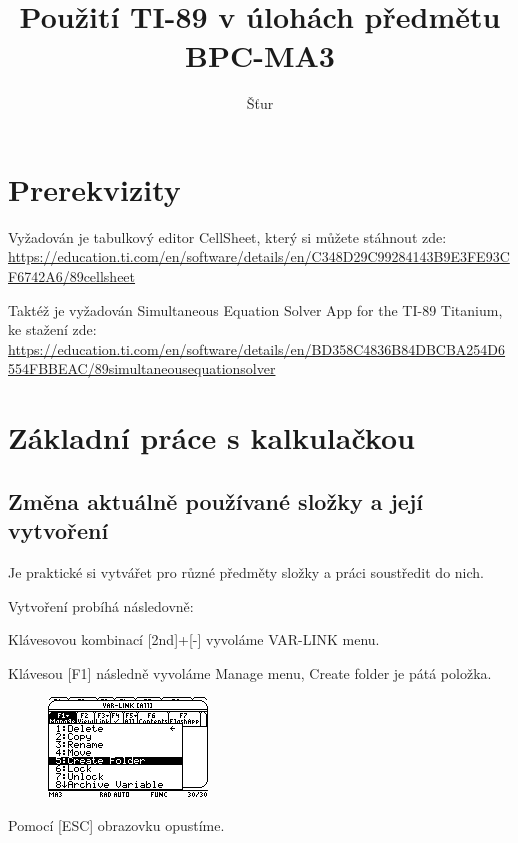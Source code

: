 \documentclass[10pt,a4paper,float]{article}
\author{Šťur}
\title{Použití TI-89 v úlohách předmětu BPC-MA3}
\begin{document}
\maketitle

\pagebreak

\tableofcontents

\pagebreak

\section{Prerekvizity}
Vyžadován je tabulkový editor CellSheet, který si můžete stáhnout zde:\\ \url{https://education.ti.com/en/software/details/en/C348D29C99284143B9E3FE93CF6742A6/89cellsheet}

Taktéž je vyžadován Simultaneous Equation Solver App for the TI-89 Titanium, ke stažení zde:\\ \url{https://education.ti.com/en/software/details/en/BD358C4836B84DBCBA254D6554FBBEAC/89simultaneousequationsolver}

\section{Základní práce s kalkulačkou}
\subsection{Změna aktuálně používané složky a její vytvoření}
Je praktické si vytvářet pro různé předměty složky a práci soustředit do nich.

Vytvoření probíhá následovně:

Klávesovou kombinací [2nd]+[-] vyvoláme VAR-LINK menu.

Klávesou [F1] následně vyvoláme Manage menu, Create folder je pátá položka.

\begin{figure}[H]
	\centering
	\includegraphics[width=.5\textwidth]{img/CREATEFOLDER}
\end{figure}

Pomocí [ESC] obrazovku opustíme.
\end{document}
